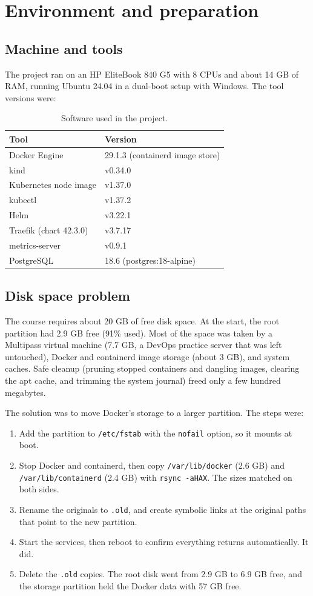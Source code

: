 \documentclass[11pt,a4paper]{article}
\begin{document}
\section{Environment and preparation}
\subsection{Machine and tools}
The project ran on an HP EliteBook 840 G5 with 8 CPUs and about 14 GB of RAM, running Ubuntu 24.04 in a dual-boot setup with Windows. The tool versions were:

\begin{table}[H]
\centering
\begin{tabular}{@{}ll@{}}
\toprule
Tool & Version \\
\midrule
Docker Engine & 29.1.3 (containerd image store) \\
kind & v0.34.0 \\
Kubernetes node image & v1.37.0 \\
kubectl & v1.37.2 \\
Helm & v3.22.1 \\
Traefik (chart 42.3.0) & v3.7.17 \\
metrics-server & v0.9.1 \\
PostgreSQL & 18.6 (postgres:18-alpine) \\
\bottomrule
\end{tabular}
\caption{Software used in the project.}
\end{table}

\subsection{Disk space problem}
The course requires about 20 GB of free disk space. At the start, the root partition had 2.9 GB free (91\% used). Most of the space was taken by a Multipass virtual machine (7.7 GB, a DevOps practice server that was left untouched), Docker and containerd image storage (about 3 GB), and system caches. Safe cleanup (pruning stopped containers and dangling images, clearing the apt cache, and trimming the system journal) freed only a few hundred megabytes.

The solution was to move Docker's storage to a larger partition. The steps were:
\begin{enumerate}[leftmargin=*]
  \item Add the partition to \texttt{/etc/fstab} with the \texttt{nofail} option, so it mounts at boot.
  \item Stop Docker and containerd, then copy \texttt{/var/lib/docker} (2.6 GB) and \texttt{/var/lib/containerd} (2.4 GB) with \texttt{rsync -aHAX}. The sizes matched on both sides.
  \item Rename the originals to \texttt{.old}, and create symbolic links at the original paths that point to the new partition.
  \item Start the services, then reboot to confirm everything returns automatically. It did.
  \item Delete the \texttt{.old} copies. The root disk went from 2.9 GB to 6.9 GB free, and the storage partition held the Docker data with 57 GB free.
\end{enumerate}
\end{document}

